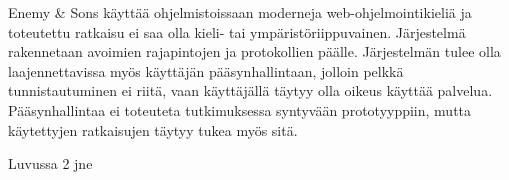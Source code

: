 Enemy \& Sons käyttää ohjelmistoissaan moderneja web-ohjelmointikieliä ja toteutettu ratkaisu ei saa olla kieli- tai ympäristöriippuvainen. Järjestelmä rakennetaan avoimien rajapintojen ja protokollien päälle. Järjestelmän tulee olla laajennettavissa myös käyttäjän pääsynhallintaan, jolloin pelkkä tunnistautuminen ei riitä, vaan käyttäjällä täytyy olla oikeus käyttää palvelua. Pääsynhallintaa ei toteuteta tutkimuksessa syntyvään prototyyppiin, mutta käytettyjen ratkaisujen täytyy tukea myös sitä.

Luvussa 2 jne